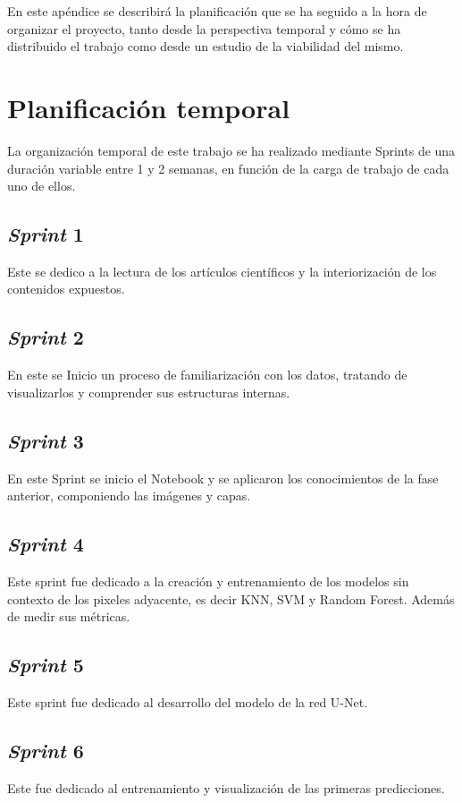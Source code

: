 
En este apéndice se describirá la planificación que se ha seguido a la hora de organizar el proyecto, tanto desde la perspectiva temporal y cómo se ha distribuido el trabajo como desde un estudio de la viabilidad del mismo.

\section{Planificación temporal}

La organización temporal de este trabajo se ha realizado mediante Sprints de una duración variable entre 1 y 2 semanas, en función de la carga de trabajo de cada uno de ellos.

\subsection{\textit{Sprint} 1}
Este se dedico a la lectura de los artículos científicos y la interiorización de los contenidos expuestos.

\subsection{\textit{Sprint} 2}
En este se Inicio un proceso de familiarización con los datos, tratando de visualizarlos y comprender sus estructuras internas.

\subsection{\textit{Sprint} 3}
En este Sprint se inicio el Notebook y se aplicaron los conocimientos de la fase anterior, componiendo las imágenes y capas.

\subsection{\textit{Sprint} 4}
Este sprint fue dedicado a la creación y entrenamiento de los modelos sin contexto de los pixeles adyacente, es decir KNN, SVM y Random Forest. Además de medir sus métricas.

\subsection{\textit{Sprint} 5}
Este sprint fue dedicado al desarrollo del modelo de la red U-Net.

\subsection{\textit{Sprint} 6}
Este fue dedicado al entrenamiento y visualización de las primeras predicciones.

